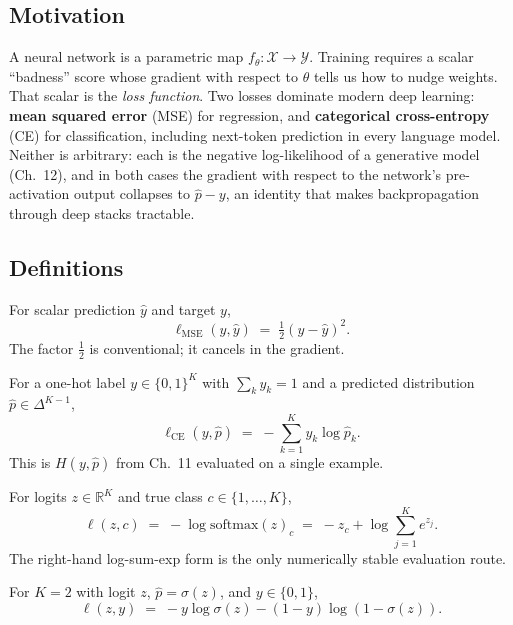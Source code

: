 \subsection*{Motivation}

A neural network is a parametric map $f_\theta : \mathcal{X} \to \mathcal{Y}$. Training requires a scalar
``badness'' score whose gradient with respect to $\theta$ tells us how to nudge weights. That scalar is the
\emph{loss function}. Two losses dominate modern deep learning: \textbf{mean squared error} (MSE) for
regression, and \textbf{categorical cross-entropy} (CE) for classification, including next-token prediction
in every language model. Neither is arbitrary: each is the negative log-likelihood of a generative model
(Ch.~12), and in both cases the gradient with respect to the network's pre-activation output collapses to
$\hat p - y$, an identity that makes backpropagation through deep stacks tractable.

\subsection*{Definitions}

\begin{definition}
For scalar prediction $\hat y$ and target $y$,
\[
\ell_{\mathrm{MSE}}(y, \hat y) \;=\; \tfrac{1}{2}(y - \hat y)^2.
\]
The factor $\tfrac12$ is conventional; it cancels in the gradient.
\end{definition}

\begin{definition}
For a one-hot label $y \in \{0,1\}^K$ with $\sum_k y_k = 1$ and a predicted distribution
$\hat p \in \Delta^{K-1}$,
\[
\ell_{\mathrm{CE}}(y, \hat p) \;=\; -\sum_{k=1}^K y_k \log \hat p_k.
\]
This is $H(y, \hat p)$ from Ch.~11 evaluated on a single example.
\end{definition}

\begin{definition}
For logits $z \in \mathbb{R}^K$ and true class $c \in \{1,\dots,K\}$,
\[
\ell(z, c) \;=\; -\log \mathrm{softmax}(z)_c \;=\; -z_c + \log \sum_{j=1}^K e^{z_j}.
\]
The right-hand log-sum-exp form is the only numerically stable evaluation route.
\end{definition}

\begin{definition}
For $K=2$ with logit $z$, $\hat p = \sigma(z)$, and $y \in \{0,1\}$,
\[
\ell(z, y) \;=\; -y \log \sigma(z) - (1-y)\log(1-\sigma(z)).
\]
\end{definition}

